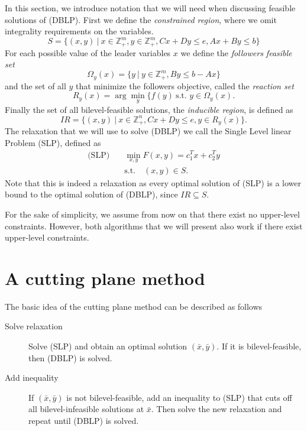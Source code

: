 \documentclass{article}
\begin{document}
In this section, we introduce notation that we will need when discussing feasible solutions of (DBLP). 
First we define the \textit{constrained region}, where we omit integrality requirements on the variables.
\begin{equation*}
	S = \{(x,y) \ | \ x \in \mathbb{Z}^m_+, y \in \mathbb{Z}^m_+, Cx+Dy \le e, Ax + By \le b \}
\end{equation*}
For each possible value of the leader variables $x$ we define the \textit{followers feasible set}
\begin{equation*}
	\Omega_y(x) = \{y \ | \ y \in \mathbb{Z}^m_+, By \le b - Ax \}
\end{equation*}
and the set of all $y$ that minimize the followers objective, called the \textit{reaction set}
\begin{equation*}
	R_y(x) = \arg \min_y \{f(y) \ \text{s.t. } y \in \Omega_y(x).
\end{equation*}
Finally the set of all bilevel-feasible solutions, the \textit{inducible region}, is defined as
\begin{equation*}
	IR = \{(x,y) \ | \ x \in \mathbb{Z}^n_+, Cx+Dy \le e, y \in R_y(x)\}.
\end{equation*}
The relaxation that we will use to solve (DBLP) we call the Single Level linear Problem (SLP), defined as
\begin{align*}
\text{(SLP)} \quad &\min_{x,y} F(x,y) = c_1^Tx +c_2^Ty \\
&\text{s.t.} \quad (x,y) \in S.
\end{align*} 
Note that this is indeed a relaxation as every optimal solution of (SLP) is a lower bound to the optimal solution of (DBLP), since $IR \subseteq S$.

For the sake of simplicity, we assume from now on that there exist no upper-level constraints. However, both algorithms that we will present also work if there exist upper-level constraints.

\section{A cutting plane method}
\label{cp}

The basic idea of the cutting plane method can be described as follows
\begin{description}
	\item[Solve relaxation] Solve (SLP) and obtain an optimal solution $(\bar x, \bar y)$.
	If it is bilevel-feasible, then (DBLP) is solved.
	\item[Add inequality] If $(\bar x, \bar y)$ is not bilevel-feasible, add an inequality to (SLP) that cuts off all bilevel-infeasible solutions at $\bar x$. Then solve the new relaxation and repeat until (DBLP) is solved.
\end{description}
\end{document}

